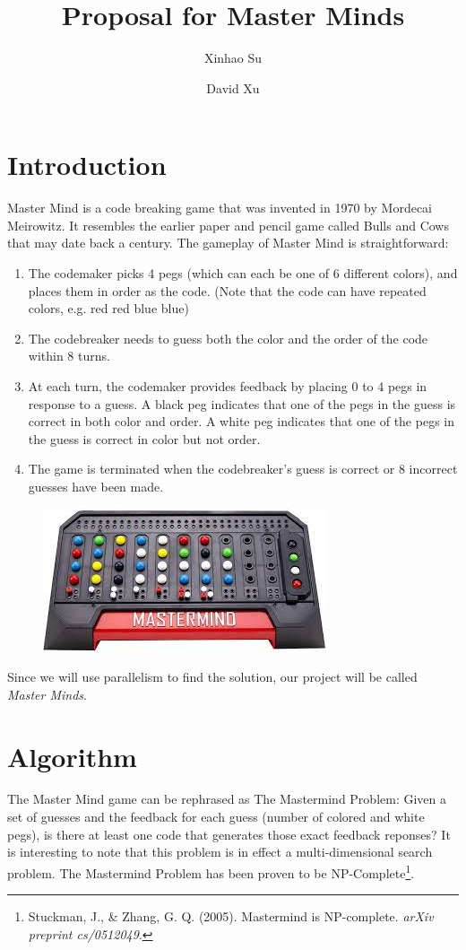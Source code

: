 \documentclass{article}
\title{Proposal for Master Minds}
\author{Xinhao Su \and David Xu}
\begin{document}
\maketitle
\section{Introduction}
Master Mind is a code breaking game that was invented in 1970 by Mordecai Meirowitz. 
It resembles the earlier paper and pencil game 
called Bulls and Cows that may date back a century. 
The gameplay of Master Mind is straightforward:
\begin{enumerate}
	\item The codemaker picks 4 pegs (which can each be one of 6 different colors), and places them in order as the code. (Note that the code can have repeated colors, e.g. red red blue blue)
	\item The codebreaker needs to guess both the color and the order of the code within 8 turns. 
	\item At each turn, the codemaker provides feedback by placing 0 to 4 pegs in response to a guess.
	A black peg indicates that one of the pegs in the guess is correct in both color and order. 
	A white peg indicates that one of the pegs in the guess is correct in color but not order. 
	\item The game is terminated when the codebreaker's guess is correct or 8 incorrect guesses have been made.
\end{enumerate}
\begin{figure}[h]
	\centering
	\includegraphics{mm.jpeg}
\end{figure}
Since we will use parallelism to find the solution, our project will be called \textit{Master Minds}.


\pagebreak
\section{Algorithm}

The Master Mind game can be rephrased as The Mastermind Problem: 
Given a set of guesses and the feedback for each guess (number of colored and white pegs), is there at least one code that generates those exact feedback reponses?
It is interesting to note that this problem is in effect a multi-dimensional search problem.
The Mastermind Problem has been proven to be NP-Complete\footnote{Stuckman, J., \& Zhang, G. Q. (2005). Mastermind is NP-complete. \textit{arXiv preprint cs/0512049}.}.
\end{document}

